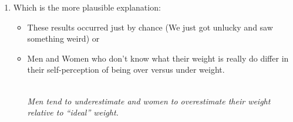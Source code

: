 \begin{enumerate}
\begin{enumerate}
   \item  Which is the more plausible explanation:
     \begin{itemize}
     \item 
     These results   occurred just by chance (We just got unlucky and
     saw something weird) or
   \item 
     Men and Women who don't know what their weight is really do
     differ in their self-perception of being over versus under weight.
\begin{students}
       \vspace{2cm}
\end{students}
\begin{key}
 \\  {\it Men tend to underestimate and women to overestimate their
     weight relative to ``ideal'' weight.}  
\end{key}
     \end{itemize}


\end{enumerate}
\end{enumerate}
